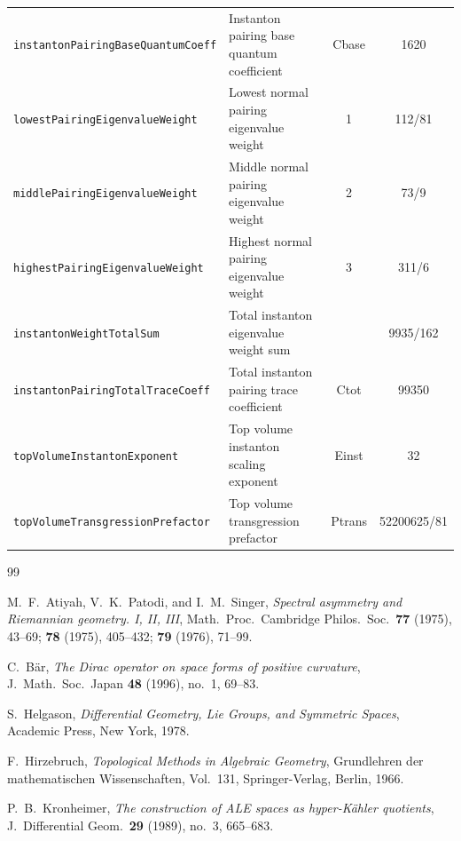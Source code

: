 \documentclass[11pt,reqno]{amsart}
\theoremstyle{definition}
\theoremstyle{remark}
\begin{document}
\begin{table}[htbp]
\begin{tabular}{@{}llcc@{}}
\texttt{instantonPairingBaseQuantumCoeff} & Instanton pairing base quantum coefficient & Cbase & 1620 \\
\texttt{lowestPairingEigenvalueWeight} & Lowest normal pairing eigenvalue weight & 1 & 112/81 \\
\texttt{middlePairingEigenvalueWeight} & Middle normal pairing eigenvalue weight & 2 & 73/9 \\
\texttt{highestPairingEigenvalueWeight} & Highest normal pairing eigenvalue weight & 3 & 311/6 \\
\texttt{instantonWeightTotalSum} & Total instanton eigenvalue weight sum &  & 9935/162 \\
\texttt{instantonPairingTotalTraceCoeff} & Total instanton pairing trace coefficient & Ctot & 99350 \\
\texttt{topVolumeInstantonExponent} & Top volume instanton scaling exponent & Einst & 32 \\
\texttt{topVolumeTransgressionPrefactor} & Top volume transgression prefactor & Ptrans & 52200625/81 \\
\bottomrule
\end{tabular}
\end{table}

\begin{thebibliography}{99}

M.~F.~Atiyah, V.~K.~Patodi, and I.~M.~Singer, \emph{Spectral asymmetry and Riemannian geometry. I, II, III}, Math.\ Proc.\ Cambridge Philos.\ Soc.\ \textbf{77} (1975), 43--69; \textbf{78} (1975), 405--432; \textbf{79} (1976), 71--99.

C.~B\"ar, \emph{The Dirac operator on space forms of positive curvature}, J.\ Math.\ Soc.\ Japan \textbf{48} (1996), no.~1, 69--83.

S.~Helgason, \emph{Differential Geometry, Lie Groups, and Symmetric Spaces}, Academic Press, New York, 1978.

F.~Hirzebruch, \emph{Topological Methods in Algebraic Geometry}, Grundlehren der mathematischen Wissenschaften, Vol.~131, Springer-Verlag, Berlin, 1966.

P.~B.~Kronheimer, \emph{The construction of ALE spaces as hyper-K\"ahler quotients}, J.\ Differential Geom.\ \textbf{29} (1989), no.~3, 665--683.

\end{thebibliography}
\end{document}
